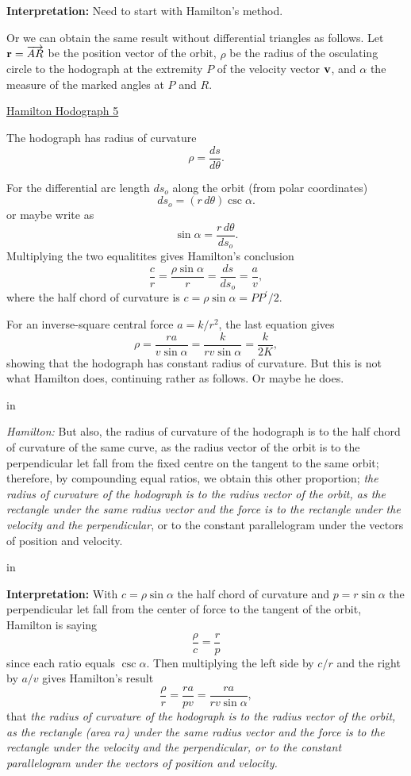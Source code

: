 \documentclass{ximera}
\newcommand{\pskip}{\vskip 0.1 in}
\begin{document}
{\bf Interpretation:} Need to start with Hamilton's method.


Or we can obtain the same result without differential triangles as follows. Let ${\bf r}=\overrightarrow{AR}$ be the position vector of the orbit, $\rho$ be the radius of the osculating circle to the hodograph at the extremity $P$ of the velocity vector ${\bf v}$, and $\alpha$ the measure of the marked angles at $P$ and $R$. 

\begin{onlineOnly}
    \begin{center}
\end{center}
\end{onlineOnly}

\href{https://www.desmos.com/calculator/synarqkbip}{Hamilton Hodograph 5}

The hodograph has radius of curvature 
\[
   \rho = \frac{ds}{d\theta} .
\] 

For the differential arc length $ds_o$ along the orbit (from polar coordinates)
\[
     ds_o = (r \, d\theta) \csc\alpha .
\]
or maybe write as
\[
   \sin\alpha = \frac{r \, d\theta}{ds_o}.
\]
Multiplying the two equalitites gives Hamilton's conclusion
\[
   \frac{c}{r} =  \frac{\rho \sin\alpha}{r} = \frac{ds}{ds_o} = \frac{a}{v}, 
\]
where the half chord of curvature is $c = \rho\sin\alpha = PP^\prime/2$.

For an inverse-square central force $a=k/r^2$, the last equation gives
\[
     \rho = \frac{r a}{v\sin\alpha} = \frac{k}{rv\sin\alpha} = \frac{k}{2K},
\] 
showing that the hodograph has constant radius of curvature. But this is not what Hamilton does, continuing rather as follows. Or maybe he does.

\pskip

\emph{Hamilton:} But also, the radius of curvature of the hodograph is to the half chord of curvature of the same curve, as the radius vector of the orbit is to the perpendicular let fall from the fixed centre on the tangent to the same orbit; therefore, by compounding equal ratios, we obtain this other proportion; \emph{the radius of curvature of the hodograph is to the radius vector of the orbit, as the rectangle under the same radius vector and the force is to the rectangle under the velocity and the perpendicular}, or to the constant parallelogram under the vectors of position and velocity.


\pskip

{\bf Interpretation:} With $c=\rho\sin\alpha$ the half chord of curvature and $p = r\sin\alpha$ the perpendicular let fall from the center of force to the tangent of the orbit, Hamilton is saying
\[
   \frac{\rho}{c} = \frac{r}{p} 
\]
since each ratio equals $\csc \alpha$. Then multiplying the left side by $c/r$ and the right by $a/v$ gives Hamilton's result
\[
   \frac{\rho}{r} = \frac{ra}{pv} = \frac{ra}{rv \sin\alpha},
\]
that \emph{the radius of curvature of the hodograph is to the radius vector of the orbit, as the rectangle (area $ra$) under the same radius vector and the force is to the rectangle under the velocity and the perpendicular, or to the constant parallelogram under the vectors of position and velocity.}
\end{document}
